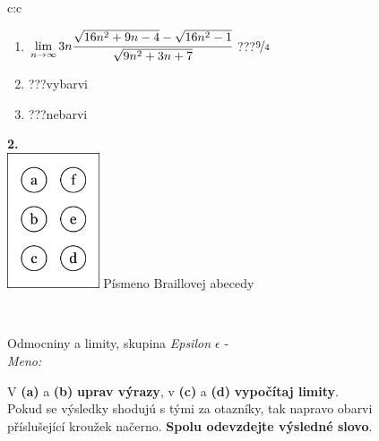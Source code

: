 \documentclass[10pt]{report}
\begin{document}
\begin{tabular}{c:c}
\begin{minipage}[c][104.5mm][t]{0.5\linewidth}
\begin{center}
\begin{minipage}{0.79\linewidth}
\begin{center}
\begin{varwidth}{\linewidth}
\begin{enumerate}
\item $\lim\limits_{n\to\infty}3n\cfrac{\sqrt{16n^2+9n-4}-\sqrt{16n^2-1}}{\sqrt{9n^2+3n+7}}$\quad \dotfill\; ???\;\dotfill \quad $\nicefrac{9}{4}$
\item \quad \dotfill\; ???\;\dotfill \quad vybarvi
\item \quad \dotfill\; ???\;\dotfill \quad nebarvi
\end{enumerate}
\end{varwidth}
\end{center}
\end{minipage}
\begin{minipage}{0.20\linewidth}
\begin{center}
{\Huge\bfseries 2.} \\[2mm]
\includegraphics[height=40mm]{../images/braille.png}
{\small Písmeno Braillovej abecedy}
\end{center}
\end{minipage}
\end{center}
\end{minipage}
\\ \hdashline
\begin{minipage}[c][104.5mm][t]{0.5\linewidth}
\begin{center}
\vspace{7mm}
{\huge Odmocniny a limity, skupina \textit{Epsilon $\epsilon$} -}\\[5mm]
\textit{Meno:}\phantom{xxxxxxxxxxxxxxxxxxxxxxxxxxxxxxxxxxxxxxxxxxxxxxxxxxxxxxxxxxxxxxxxx}\\[5mm]
\begin{minipage}{0.95\linewidth}
\begin{center}
V \textbf{(a)} a \textbf{(b)} \textbf{uprav výrazy}, v \textbf{(c)} a \textbf{(d)} \textbf{vypočítaj limity}.\\Pokud se výsledky shodujú s tými za otazníky, tak napravo obarvi\\příslušející kroužek načerno. \textbf{Spolu odevzdejte výsledné slovo}.
\end{center}
\end{minipage}
\\[1mm]

\end{center}
\end{minipage}
\end{tabular}
\end{document}
